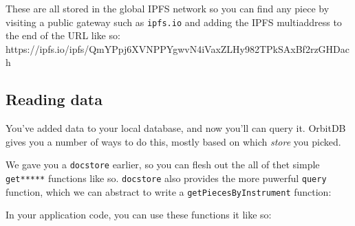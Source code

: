 These are all stored in the global IPFS network so you can find any
piece by visiting a public gateway such as \texttt{ipfs.io} and adding
the IPFS multiaddress to the end of the URL like so:
https://ipfs.io/ipfs/QmYPpj6XVNPPYgwvN4iVaxZLHy982TPkSAxBf2rzGHDach

\hypertarget{reading-data}{\subsection{Reading
data}\label{reading-data}}

You've added data to your local database, and now you'll can query it.
OrbitDB gives you a number of ways to do this, mostly based on which
\emph{store} you picked.

We gave you a \texttt{docstore} earlier, so you can flesh out the all of
thet simple \texttt{get*****} functions like so. \texttt{docstore} also
provides the more puwerful \texttt{query} function, which we can
abstract to write a \texttt{getPiecesByInstrument} function:

\begin{Shaded}
\begin{Highlighting}[]
\NormalTok{() }\OperatorTok{\{}
  \OperatorTok{=} \NormalTok{(}\NormalTok{)}
\OperatorTok{\}}

\OperatorTok{\{}
  \OperatorTok{=} \NormalTok{(hash)[}\NormalTok{]}
\OperatorTok{\}}

\OperatorTok{\{}
   \OperatorTok{=>}  \OperatorTok{===}
\OperatorTok{\}}
\end{Highlighting}
\end{Shaded}

In your application code, you can use these functions it like so:

\begin{Shaded}
\begin{Highlighting}[]
\OperatorTok{=} \NormalTok{()}
\OperatorTok{=>} \OperatorTok{\{}  \OperatorTok{\}}\NormalTok{)}

\OperatorTok{=} \NormalTok{(}\NormalTok{)}
\end{Highlighting}
\end{Shaded}

